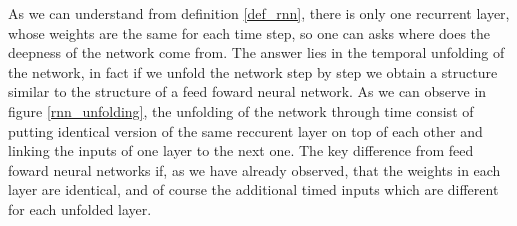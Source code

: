 As we can understand from definition \ref{def_rnn}, there is only one recurrent layer, whose weights are the same for each time step, so one can asks where does the deepness of the network come from.
The answer lies in the temporal unfolding of the network, in fact if we unfold the network step by step we obtain a structure similar to the structure of a feed foward neural network. As we can observe
in figure \ref{rnn_unfolding}, the unfolding of the network through time consist of putting identical version of the same reccurent layer on top of each other and linking the inputs of one layer to the
next one. The key difference from feed foward neural networks if, as we have already observed, that the weights in each layer are identical, and of course the additional timed inputs which are different for
each unfolded layer.

